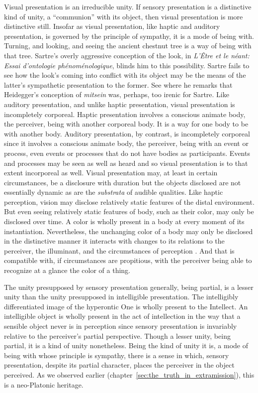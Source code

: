 Visual presentation is an irreducible unity. If sensory presentation is a distinctive kind of unity, a ``communion'' with its object, then visual presentation is more distinctive still. Insofar as visual presentation, like haptic and auditory presentation, is governed by the principle of sympathy, it is a mode of being with. Turning, and looking, and seeing the ancient chestnut tree is a way of being with that tree. Sartre's overly aggressive conception of the look, in \emph{L'Être et le néant: Essai d'ontologie phénoménologique}, blinds him to this possibility. Sartre fails to see how the look's coming into conflict with its object may be the means of the latter's sympathetic presentation to the former. See \citet[chapter 5, especially 287]{Jay:1994aa} where he remarks that Heidegger's conception of \emph{mitsein} was, perhaps, too irenic for Sartre. Like auditory presentation, and unlike haptic presentation, visual presentation is incompletely corporeal. Haptic presentation involves a conscious animate body, the perceiver, being with another corporeal body. It is a way for one body to be with another body. Auditory presentation, by contrast, is incompletely corporeal since it involves a conscious animate body, the perceiver, being with an event or process, even events or processes that do not have bodies as participants. Events and processes may be seen as well as heard and so visual presentation is to that extent incorporeal as well. Visual presentation may, at least in certain circumstances, be a disclosure with duration but the objects disclosed are not essentially dynamic as are the \emph{substrata} of audible qualities. Like haptic perception, vision may disclose relatively static features of the distal environment. But even seeing relatively static features of body, such as their color, may only be disclosed over time. A color is wholly present in a body at every moment of its instantiation. Nevertheless, the unchanging color of a body may only be disclosed in the distinctive manner it interacts with changes to its relations to the perceiver, the illuminant, and the circumstances of perception \citep{Broackes:1997pa,Noe:2004fk,Matthen:2005md}. And that is compatible with, if circumstances are propitious, with the perceiver being able to recognize at a glance the color of a thing.

The unity presupposed by sensory presentation generally, being partial, is a lesser unity than the unity presupposed in intelligible presentation. The intelligibly differentiated image of the hyperontic One is wholly present to the Intellect. An intelligible object is wholly present in the act of intellection in the way that a sensible object never is in perception since sensory presentation is invariably relative to the perceiver's partial perspective. Though a lesser unity, being partial, it is a kind of unity nonetheless. Being the kind of unity it is, a mode of being with whose principle is sympathy, there is a sense in which, sensory presentation, despite its partial character, places the perceiver in the object perceived. As we observed earlier (chapter~\ref{sec:the_truth_in_extramission}), this is a neo-Platonic heritage. 

